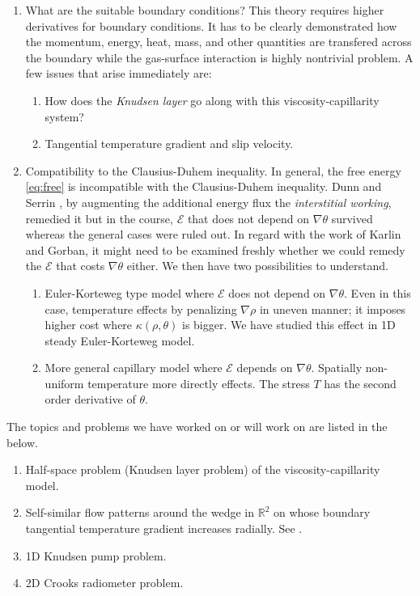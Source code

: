 \documentclass[a4paper,11pt]{article}
\def\E{\mathcal{E}}
\begin{document}
\begin{enumerate}
  \item What are the suitable boundary conditions? This theory requires higher derivatives for boundary conditions. It has to be clearly demonstrated how the momentum, energy, heat, mass, and other quantities are transfered across the boundary while the gas-surface interaction is highly nontrivial problem. A few issues that arise immediately are:
 \begin{enumerate}
  \item How does the {\it Knudsen layer} go along with this viscosity-capillarity system? %
  \item Tangential temperature gradient and slip velocity. %
 \end{enumerate}
 \item Compatibility to the Clausius-Duhem inequality. In general, the free energy \eqref{eq:free} is incompatible with the Clausius-Duhem inequality. Dunn and Serrin \cite{DS}, by augmenting the additional energy flux the {\it interstitial working}, remedied it but in the course, $\E$ that does not depend on $\nabla\theta$ survived whereas the general cases were ruled out. In regard with the work of Karlin and Gorban, it might need to be examined freshly whether we could remedy the $\E$ that costs $\nabla\theta$ either.
 We then have two possibilities to understand.
 \begin{enumerate}
  \item Euler-Korteweg type model where $\E$ does not depend on $\nabla\theta$. Even in this case, temperature effects by penalizing $\nabla\rho$ in uneven manner; it imposes higher cost where $\kappa(\rho,\theta)$ is bigger. We have studied this effect in 1D steady Euler-Korteweg model.
  \item More general capillary model where $\E$ depends on $\nabla\theta$. Spatially non-uniform temperature more directly effects. The stress $T$ has the second order derivative of $\theta$.
 \end{enumerate}
 \end{enumerate}

The topics and problems we have worked on or will work on are listed in the below.
\begin{enumerate}
 \item Half-space problem (Knudsen layer problem) of the viscosity-capillarity model. %
 \item Self-similar flow patterns around the wedge in $\mathbb{R}^2$ on whose boundary tangential temperature gradient increases radially. See \cite{kim_thermal_2015}.
 \item 1D Knudsen pump problem.
 \item 2D Crooks radiometer problem.
\end{enumerate}
\end{document}
